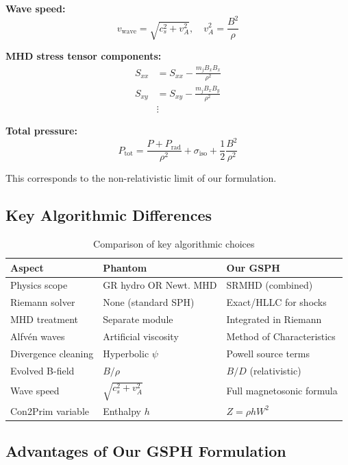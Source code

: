 \documentclass[12pt,a4paper]{article}
\begin{document}
\textbf{Wave speed:}
\begin{equation}
v_\text{wave} = \sqrt{c_s^2 + v_A^2}, \quad v_A^2 = \frac{B^2}{\rho}
\label{eq:phantom_wave}
\end{equation}

\textbf{MHD stress tensor components:}
\begin{align}
S_{xx} &= S_{xx} - \frac{m_j B_x B_x}{\rho^2} \\
S_{xy} &= S_{xy} - \frac{m_j B_x B_y}{\rho^2} \\
&\vdots
\end{align}

\textbf{Total pressure:}
\begin{equation}
P_\text{tot} = \frac{P + P_\text{rad}}{\rho^2} + \sigma_\text{iso} + \frac{1}{2}\frac{B^2}{\rho^2}
\end{equation}

This corresponds to the non-relativistic limit of our formulation.

\subsection{Key Algorithmic Differences}

\begin{table}[h]
\centering
\begin{tabular}{|l|l|l|}
\hline
\textbf{Aspect} & \textbf{Phantom} & \textbf{Our GSPH} \\
\hline
Physics scope & GR hydro OR Newt. MHD & SRMHD (combined) \\
\hline
Riemann solver & None (standard SPH) & Exact/HLLC for shocks \\
\hline
MHD treatment & Separate module & Integrated in Riemann \\
\hline
Alfv\'en waves & Artificial viscosity & Method of Characteristics \\
\hline
Divergence cleaning & Hyperbolic $\psi$ & Powell source terms \\
\hline
Evolved B-field & $B/\rho$ & $B/D$ (relativistic) \\
\hline
Wave speed & $\sqrt{c_s^2 + v_A^2}$ & Full magnetosonic formula \\
\hline
Con2Prim variable & Enthalpy $h$ & $Z = \rho h W^2$ \\
\hline
\end{tabular}
\caption{Comparison of key algorithmic choices}
\end{table}

\subsection{Advantages of Our GSPH Formulation}
\end{document}
